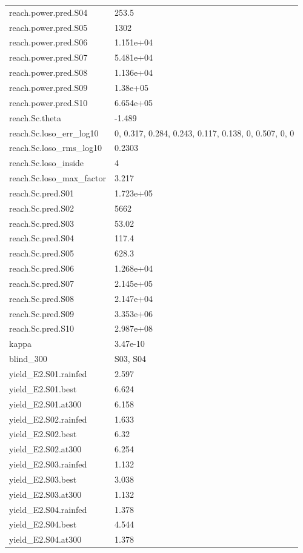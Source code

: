 {\begin{longtable}{p{}p{}}
{}reach.power.pred.S04 & 253.5\\
{}reach.power.pred.S05 & 1302\\
{}reach.power.pred.S06 & 1.151e+04\\
{}reach.power.pred.S07 & 5.481e+04\\
{}reach.power.pred.S08 & 1.136e+04\\
{}reach.power.pred.S09 & 1.38e+05\\
{}reach.power.pred.S10 & 6.654e+05\\
{}reach.Sc.theta & -1.489\\
{}reach.Sc.loso\_err\_log10 & 0, 0.317, 0.284, 0.243, 0.117, 0.138, 0, 0.507, 0, 0\\
{}reach.Sc.loso\_rms\_log10 & 0.2303\\
{}reach.Sc.loso\_inside & 4\\
{}reach.Sc.loso\_max\_factor & 3.217\\
{}reach.Sc.pred.S01 & 1.723e+05\\
{}reach.Sc.pred.S02 & 5662\\
{}reach.Sc.pred.S03 & 53.02\\
{}reach.Sc.pred.S04 & 117.4\\
{}reach.Sc.pred.S05 & 628.3\\
{}reach.Sc.pred.S06 & 1.268e+04\\
{}reach.Sc.pred.S07 & 2.145e+05\\
{}reach.Sc.pred.S08 & 2.147e+04\\
{}reach.Sc.pred.S09 & 3.353e+06\\
{}reach.Sc.pred.S10 & 2.987e+08\\
{}kappa & 3.47e-10\\
{}blind\_300 & S03, S04\\
{}yield\_E2.S01.rainfed & 2.597\\
{}yield\_E2.S01.best & 6.624\\
{}yield\_E2.S01.at300 & 6.158\\
{}yield\_E2.S02.rainfed & 1.633\\
{}yield\_E2.S02.best & 6.32\\
{}yield\_E2.S02.at300 & 6.254\\
{}yield\_E2.S03.rainfed & 1.132\\
{}yield\_E2.S03.best & 3.038\\
{}yield\_E2.S03.at300 & 1.132\\
{}yield\_E2.S04.rainfed & 1.378\\
{}yield\_E2.S04.best & 4.544\\
{}yield\_E2.S04.at300 & 1.378\\

\end{longtable}}
